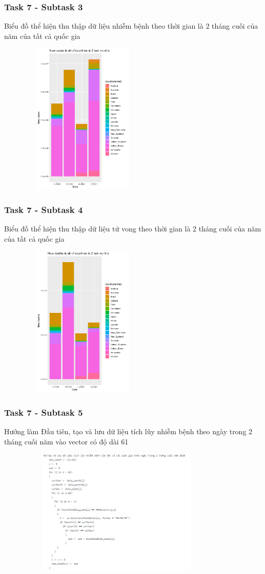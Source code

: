 \documentclass[english,10pt,table]{beamer}
\begin{document}
{
    \frametitle{Task 7 - Subtask 3}
    \begin{block}{Biểu đồ thể hiện thu thập dữ liệu nhiễm bệnh theo thời gian là 2 tháng cuối của năm của tất cả quốc gia}
	\begin{figure}[H]
		\centering
		\includegraphics[height=7.3cm,width=6cm]{images/7.3.png}
	\end{figure}
    \end{block}
}
\frame
{
    \frametitle{Task 7 - Subtask 4}
    \begin{block}{Biểu đồ thể hiện thu thập dữ liệu tử vong theo thời gian là 2 tháng cuối của năm của tất cả quốc gia}
	\begin{figure}[H]
		\centering
		\includegraphics[height=7.3cm,width=6cm]{images/7.4.png}
	\end{figure}
    \end{block}
}
\frame
{
    \frametitle{Task 7 - Subtask 5}
    \begin{block}{Hướng làm}
    Đầu tiên, tạo và lưu dữ liệu tích lũy nhiễm bệnh theo ngày trong 2 tháng cuối năm vào vector có độ dài 61
	\begin{figure}[H]
		\centering
		\includegraphics[height=6cm,width=9.5cm]{images/7.0.6.png}
	\end{figure}
    \end{block}
}
\end{document}
